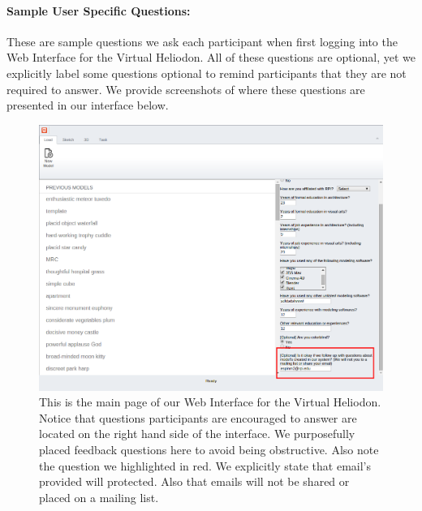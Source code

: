 \documentclass[12pt]{article}
\begin{document}
\newpage
\paragraph{Sample User Specific Questions:}
These are sample questions we ask each participant when first logging into the Web Interface for the Virtual Heliodon.
All of these questions are optional, yet we explicitly label some questions optional to remind participants that they are not required to answer. 
We provide screenshots of where these questions are presented in our interface below.

\begin{figure}[h]
\centering
\includegraphics[scale=0.4]{updated_email}
\caption{This is the main page of our Web Interface for the Virtual Heliodon. Notice that questions participants are encouraged to answer are located on the right hand side of the interface. We purposefully placed feedback questions here to avoid being obstructive. Also note the question  we highlighted in red. We explicitly state that email's provided will protected. Also that emails will not be shared or placed on a mailing list. }
\label{fig:sfig1}
\end{figure}
\end{document}
